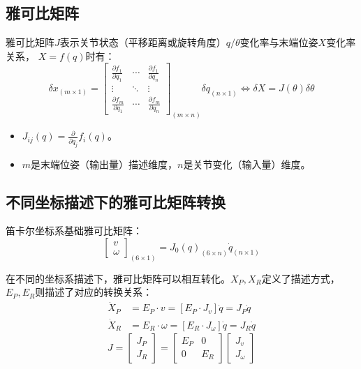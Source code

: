 \documentclass[
12pt, %
a4paper, 
oneside, %
headinclude,footinclude, %
]{scrartcl}
\begin{document}
\subsection{雅可比矩阵}
雅可比矩阵$ J $表示关节状态（平移距离或旋转角度）$ q/\theta $变化率与末端位姿$ X $变化率关系，
$ X = f(q) $时有：
$$
\delta x_{(m \times 1)} = 
\begin{bmatrix}
\frac{\partial f_1}{\partial q_1} & \cdots & \frac{\partial f_1}{\partial q_n} \\
\vdots & \ddots & \vdots \\
\frac{\partial f_m}{\partial q_1} & \cdots & \frac{\partial f_m}{\partial q_n}
\end{bmatrix}_{(m \times n)}
\delta q_{(n \times 1)}
\Leftrightarrow 
\delta X = J(\theta)\delta \theta
$$
\begin{itemize}
\item $ J_{ij}(q) = \frac{\partial}{\partial q_j} f_i(q) $。
\item $ m $是末端位姿（输出量）描述维度，$ n $是关节变化（输入量）维度。
\end{itemize} 
\subsection{不同坐标描述下的雅可比矩阵转换}
笛卡尔坐标系基础雅可比矩阵：
$$ \begin{bmatrix} v \\ \omega \end{bmatrix}_{(6 \times 1)} = J_0(q)_{(6 \times n)} \dot{q}_{(n \times 1)} $$

在不同的坐标系描述下，雅可比矩阵可以相互转化。$ X_P,X_R $定义了描述方式，$ E_P,E_R $则描述了对应的转换关系：
\begin{align*}
\dot{X}_P &= E_P \cdot v = [E_P \cdot J_v] \dot{q} = J_P \dot{q} \\
\dot{X}_R &= E_R \cdot \omega = [E_R \cdot J_\omega] \dot{q} = J_R \dot{q}
\end{align*}
$$
J = 
\begin{bmatrix} J_P \\ J_R \end{bmatrix}
=
\begin{bmatrix} E_P & 0 \\ 0 & E_R \end{bmatrix}
\begin{bmatrix} J_v \\ J_\omega \end{bmatrix}
$$
\end{document}
